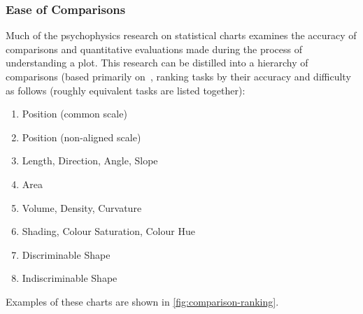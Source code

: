 \documentclass[letterpaper]{ar-1col}\usepackage[]{graphicx}\usepackage[]{color}
\begin{document}
\subsubsection{Ease of Comparisons}
Much of the psychophysics research on statistical charts examines the accuracy of comparisons and quantitative evaluations made during the process of understanding a plot. This research can be distilled into a hierarchy of comparisons (based primarily on~\citep{cleveland_graphical_1984, cleveland_graphical_1985, shah_cambridge_2005, lewandowskyPerceptionStatisticalGraphs1989}, ranking tasks by their accuracy and difficulty as follows (roughly equivalent tasks are listed together):
\begin{enumerate}
\item Position (common scale)
\item Position (non-aligned scale)
\item Length, Direction, Angle, Slope
\item Area
\item Volume, Density, Curvature
\item Shading, Colour Saturation, Colour Hue
\item Discriminable Shape
\item Indiscriminable Shape
\end{enumerate}

Examples of these charts are shown in \autoref{fig:comparison-ranking}.
\end{document}
